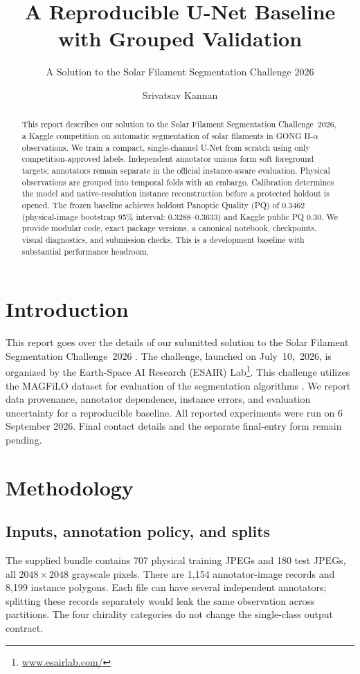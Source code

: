 \documentclass[sigconf]{acmart}
\begin{document}
\title{A Reproducible U-Net Baseline with Grouped Validation}
\subtitle{A Solution to the Solar Filament Segmentation Challenge 2026}
\author{Srivatsav Kannan}

\begin{abstract}
This report describes our solution to the Solar Filament Segmentation Challenge~2026, a Kaggle competition on automatic segmentation of solar filaments in GONG H-$\alpha$ observations.
We train a compact, single-channel U-Net from scratch using only competition-approved labels. Independent annotator unions form soft foreground targets; annotators remain separate in the official instance-aware evaluation. Physical observations are grouped into temporal folds with an embargo. Calibration determines the model and native-resolution instance reconstruction before a protected holdout is opened. The frozen baseline achieves holdout Panoptic Quality (PQ) of 0.3462 (physical-image bootstrap 95\% interval: 0.3288--0.3633) and Kaggle public PQ 0.30. We provide modular code, exact package versions, a canonical notebook, checkpoints, visual diagnostics, and submission checks. This is a development baseline with substantial performance headroom.
\end{abstract}
\maketitle
\section{Introduction}
    This report goes over the details of our submitted solution to the Solar Filament Segmentation Challenge~2026 \cite{filament-segmentation-2026}. The challenge, launched on July~10,~2026, is organized by the Earth-Space AI Research (ESAIR) Lab\footnote{\href{https://www.esairlab.com/home}{www.esairlab.com/}}. This challenge utilizes the MAGFiLO dataset for evaluation of the segmentation algorithms \cite{ahmadzadeh2024dataset}.
We report data provenance, annotator dependence, instance errors, and evaluation uncertainty for a reproducible baseline. All reported experiments were run on 6 September 2026. Final contact details and the separate final-entry form remain pending.

\section{Methodology}\label{sec:methodology}
\subsection{Inputs, annotation policy, and splits}
The supplied bundle contains 707 physical training JPEGs and 180 test JPEGs, all $2048\times2048$ grayscale pixels. There are 1,154 annotator-image records and 8,199 instance polygons. Each file can have several independent annotators; splitting these records separately would leak the same observation across partitions. The four chirality categories do not change the single-class output contract.
\end{document}
